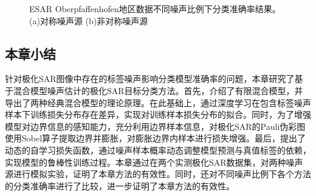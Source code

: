 \begin{figure}[ht!]
    \caption{ESAR Oberpfaffenhofen地区数据不同噪声比例下分类准确率结果。(a)对称噪声源 (b)非对称噪声源}
    \label{fig:ober_noise}
\end{figure}

\subsection{本章小结}
针对极化SAR图像中存在的标签噪声影响分类模型准确率的问题，本章研究了基于混合模型噪声估计的极化SAR目标分类方法。首先，介绍了有限混合模型，并导出了两种经典混合模型的理论原理。在此基础上，通过深度学习在包含标签噪声样本下训练损失分布存在差异，实现对训练样本损失分布的拟合。同时，为了增强模型对边界信息的感知能力，充分利用边界样本信息，对极化SAR的Pauli伪彩图使用Sobel算子提取边界并膨胀，对膨胀边界内样本进行损失增强。最后，提出了动态的自学习损失函数，通过噪声样本概率动态调整模型预测与真值标签的依赖，实现模型的鲁棒性训练过程。本章通过在两个实测极化SAR数据集，对两种噪声源进行模拟实验，证明了本章方法的有效性。同时，还对不同噪声比例下各个方法的分类准确率进行了比较，进一步证明了本章方法的有效性。